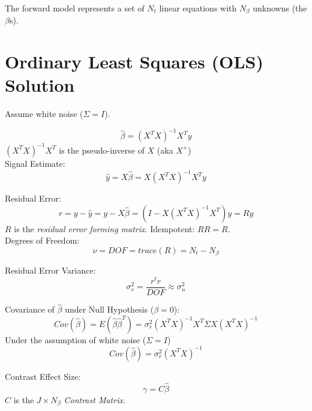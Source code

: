 \documentclass{article}
\begin{document}
\noindent
The forward model represents a set of $N_t$ linear equations with
$N_\beta$ unknowns (the $\beta$s).

\section{Ordinary Least Squares (OLS) Solution}

Assume white noise  ($\Sigma = I$).

\begin{equation}
\hat{\beta} = (X^T X)^{-1}  X^T y
\end{equation}
$(X^T X)^{-1}  X^T$ is the pseudo-inverse of $X$ (aka $X^+$)\\

\noindent
Signal Estimate:
\begin{equation}
\hat{y} = X\hat{\beta} = X (X^T X)^{-1}  X^T y
\end{equation}

\noindent
Residual Error:
\begin{equation}
r = y - \hat{y} = y - X\hat{\beta} = (I - X (X^T X)^{-1}  X^T) y = R y
\end{equation}
$R$ is the {\em residual error forming matrix}. Idempotent: $R R=R$.\\

\noindent
Degrees of Freedom:
\begin{equation}
\nu = DOF = trace(R) = N_t - N_\beta
\end{equation}

\noindent
Residual Error Variance:
\begin{equation}
\sigma_r^2 = \frac{r^t r}{DOF} \approx \sigma_n^2
\end{equation}

\noindent
Covariance of $\hat{\beta}$ under Null Hypothesis ($\beta = 0$):
\begin{equation}
Cov(\hat{\beta}) = E(\hat{\beta} \hat{\beta}^T) =
\sigma_r^2 (X^T X)^{-1}  X^T \Sigma X (X^T X)^{-1} 
\end{equation}
Under the assumption of white noise ($\Sigma = I$)
\begin{equation}
Cov(\hat{\beta}) = \sigma_r^2 (X^T X)^{-1}
\end{equation}

\noindent
Contrast Effect Size:
\begin{equation}
\gamma = C \hat\beta
\end{equation}
$C$ is the $J \times N_\beta$ {\em Contrast Matrix}.\\
\end{document}
